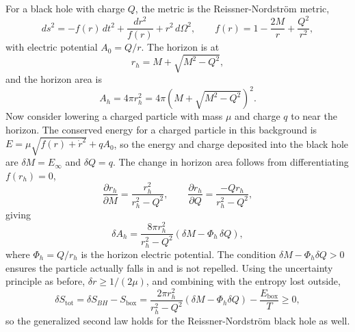 For a black hole with charge $Q$, the metric is the
Reissner-Nordstr\"{o}m metric,
\begin{equation}
	ds^2 = -f(r)\,dt^2 + \frac{dr^2}{f(r)} + r^2\,d\Omega^2,
	\qquad f(r) = 1 - \frac{2M}{r} + \frac{Q^2}{r^2},
\end{equation}
with electric potential $A_0 = Q/r$. The horizon is at
\begin{equation}
	r_h = M + \sqrt{M^2 - Q^2},
\end{equation}
and the horizon area is
\begin{equation}
	A_h = 4\pi r_h^2
	= 4\pi\left(M+\sqrt{M^2-Q^2}\right)^2.
\end{equation}
Now consider lowering a charged particle with mass $\mu$ and charge $q$
to near the horizon. The conserved energy for a charged particle in
this background is $E = \mu\sqrt{f(r)+\dot r^2} + qA_0$, so the
energy and charge deposited into the black hole are
$\delta M = E_\infty$ and $\delta Q = q$. The change in horizon area
follows from differentiating $f(r_h) = 0$,
\begin{equation}
	\frac{\partial r_h}{\partial M}
	= \frac{r_h^2}{r_h^2-Q^2}, \qquad
	\frac{\partial r_h}{\partial Q}
	= \frac{-Qr_h}{r_h^2-Q^2},
\end{equation}
giving
\begin{equation}
	\delta A_h = \frac{8\pi r_h^2}{r_h^2-Q^2}
	\left(\delta M - \Phi_h\,\delta Q\right),
\end{equation}
where $\Phi_h = Q/r_h$ is the horizon electric potential. The condition
$\delta M - \Phi_h\delta Q > 0$ ensures the particle actually falls in
and is not repelled. Using the uncertainty principle as before,
$\delta r \geq 1/(2\mu)$, and combining with the entropy lost outside,
\begin{equation}
	\delta S_{\text{tot}} = \delta S_{BH} - S_{\text{box}}
	= \frac{2\pi r_h^2}{r_h^2-Q^2}
	\left(\delta M - \Phi_h\delta Q\right) - \frac{E_{\text{box}}}{T}
	\geq 0,
\end{equation}
so the generalized second law holds for the Reissner-Nordstr\"{o}m
black hole as well.
